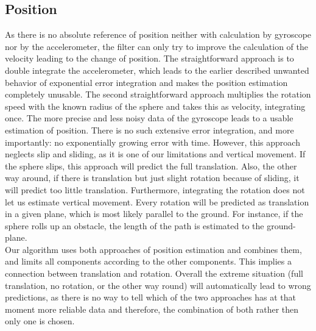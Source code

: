 \documentclass[letterpaper, 10 pt, conference]{ieeeconf}  %
\begin{document}
\subsection{Position}
As there is no absolute reference of position neither with calculation by gyroscope nor by the accelerometer, the filter can only try to improve the calculation of the velocity leading to the change of position. 
The straightforward approach is to double integrate the accelerometer, which leads to the earlier described unwanted behavior of exponential error integration and makes the position estimation completely unusable. 
The second straightforward approach multiplies the rotation speed with the known radius of the sphere and takes this as velocity, integrating once.
The more precise and less noisy data of the gyroscope leads to a usable estimation of position. 
There is no such extensive error integration, and more importantly: no exponentially growing error with time. However, this approach neglects slip and sliding, as it is one of our limitations and vertical movement. 
If the sphere slips, this approach will predict the full translation.
Also, the other way around, if there is translation but just slight rotation because of sliding, it will predict too little translation. 
Furthermore, integrating the rotation does not let us estimate vertical movement.
Every rotation will be predicted as translation in a given plane, which is most likely parallel to the ground. 
For instance, if the sphere rolls up an obstacle, the length of the path is estimated to the ground-plane.\\
Our algorithm uses both approaches of position estimation and combines them, and limits all components according to the other components. 
This implies a connection between translation and rotation. 
Overall the extreme situation (full translation, no rotation, or the other way round) will automatically lead to wrong predictions, as there is no way to tell which of the two approaches has at that moment more reliable data and therefore, the combination of both rather then only one is chosen.
\end{document}

